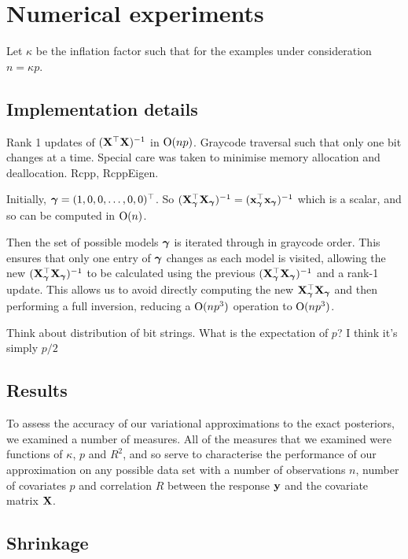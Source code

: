 \documentclass{amsart}[12pt]
\newcommand{\mgc}[1]{{\color{blue}#1}}
\begin{document}
\section{Numerical experiments}
\label{sec:num_exp}

Let $\kappa$ be the inflation factor such that for the examples under consideration $n = \kappa p$.

\subsection{Implementation details}
\label{sec:implementation}

Rank 1 updates of $({\bf X}^\top {\bf X})^{-1}$ in $\text{O}(np)$.
Graycode traversal such that only one bit changes at a time.
Special care was taken to minimise memory allocation and deallocation.
Rcpp, RcppEigen.

Initially, ${\boldsymbol \gamma} = (1, 0, 0, \ldots, 0, 0)^\top$. So
$({\bf X}_{\boldsymbol \gamma}^\top {\bf X}_{\boldsymbol \gamma})^{-1} = ({\bf x}_{\boldsymbol \gamma}^\top {\bf x}_{\boldsymbol \gamma})^{-1}$ which is a scalar, and so can be
computed in $\text{O}(n)$.

Then the set of possible models ${\boldsymbol \gamma}$ is iterated through in graycode order. This ensures that only one
entry of ${\boldsymbol \gamma}$ changes as each model is visited, allowing the new $({\bf X}_{\boldsymbol \gamma}^\top {\bf X}_{\boldsymbol \gamma})^{-1}$ to
be calculated using the previous $({\bf X}_{\boldsymbol \gamma}^\top {\bf X}_{\boldsymbol \gamma})^{-1}$ and a rank-1 update. This allows us to
avoid directly computing the new ${\bf X}_{\boldsymbol \gamma}^\top {\bf X}_{\boldsymbol \gamma}$ and then performing a full inversion, reducing
a $\text{O}(n p^3)$ operation to $\text{O}(n p^3)$.

\mgc{Think about distribution of bit strings. What is the expectation of $p$? I think it's simply $p/2$}

\subsection{Results}

To assess the accuracy of our variational approximations to the exact posteriors, we examined a number of
measures. All of the measures that we examined were functions of $\kappa$, $p$ and $R^2$, and so serve to
characterise the performance of our approximation on any possible data set with a number of observations
$n$, number of covariates $p$ and correlation $R$ between the response ${\bf y}$ and the covariate matrix ${\bf X}$.

\subsection{Shrinkage}
\end{document}
